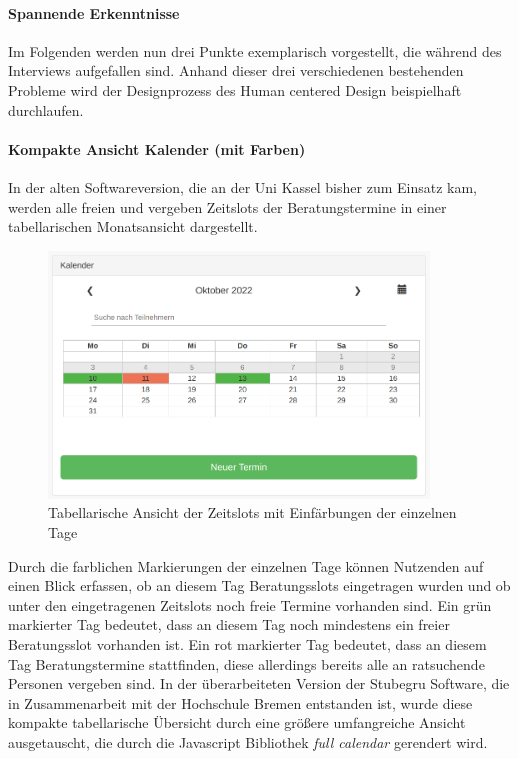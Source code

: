 \documentclass[12pt]{article}
\begin{document}
\paragraph{Spannende Erkenntnisse}
Im Folgenden werden nun drei Punkte exemplarisch vorgestellt, die während des
Interviews aufgefallen sind. Anhand dieser drei verschiedenen bestehenden
Probleme wird der Designprozess des Human centered Design beispielhaft
durchlaufen.

\paragraph{Kompakte Ansicht Kalender (mit Farben)}
In der alten Softwareversion, die an der Uni Kassel bisher zum Einsatz kam,
werden alle freien und vergeben Zeitslots der Beratungstermine in einer
tabellarischen Monatsansicht dargestellt.

\begin{figure}[h]
    \caption{Tabellarische Ansicht der Zeitslots mit Einfärbungen der einzelnen Tage}
    \centering
    \includegraphics[width=0.9\textwidth]{screen_old_module.png}
\end{figure}

Durch die farblichen Markierungen der einzelnen Tage können Nutzenden auf einen
Blick erfassen, ob an diesem Tag Beratungsslots eingetragen wurden und ob unter
den eingetragenen Zeitslots noch freie Termine vorhanden sind. Ein grün
markierter Tag bedeutet, dass an diesem Tag noch mindestens ein freier
Beratungsslot vorhanden ist. Ein rot markierter Tag bedeutet, dass an diesem
Tag Beratungstermine stattfinden, diese allerdings bereits alle an ratsuchende
Personen vergeben sind. In der überarbeiteten Version der Stubegru Software,
die in Zusammenarbeit mit der Hochschule Bremen entstanden ist, wurde diese
kompakte tabellarische Übersicht durch eine größere umfangreiche Ansicht
ausgetauscht, die durch die Javascript Bibliothek \textit{full
    calendar}\cite{fullCalendarWeb} gerendert wird.
\end{document}
